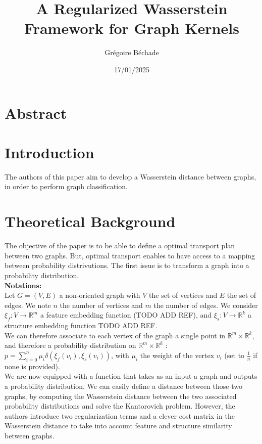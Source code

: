\documentclass[a4paper,11pt]{article}
\begin{document}
\title{A Regularized Wasserstein Framework for Graph Kernels}
\author{Grégoire Béchade}
\date{17/01/2025}
\maketitle

\section{Abstract}

\section{Introduction}

The authors of this paper aim to develop a Wasserstein distance between graphs, in order to perform graph classification. 





\section{Theoretical Background}

The objective of the paper is to be able to define a optimal transport plan between two graphs. 
But, optimal transport enables to have access to a mapping between probability distrivutions. 
The first issue is to transform a graph into a probability distribution.\\[0.5cm]
\textbf{Notations:} \\
Let $G=(V, E)$ a non-oriented graph with $V$ the set of vertices and $E$ the set of edges.
We note $n$ the number of vertices and $m$ the number of edges.
We consider $\xi_f : V \rightarrow \mathbb{R}^m$ a feature embedding function (TODO ADD REF), and $\xi_s : V \rightarrow \mathbb{R}^k$ a structure embedding function TODO ADD REF.\\
We can therefore associate to each vertex of the graph a single point in $\mathbb{R}^m \times \mathbb{R}^k$, and therefore a probability distribution on $\mathbb{R}^m \times \mathbb{R}^k$ : $p = \sum_{i=0}^{n} \mu_i \delta(\xi_f(v_i), \xi_s(v_i))$, with $\mu_i$ the weight of the vertex $v_i$ (set to $\frac{1}{n}$ if none is provided).\\


We are now equipped with a function that takes as an input a graph and outputs a probability distribution.
We can easily define a distance between those two graphs, by computing the Wasserstein distance between the two associated probability distributions and solve the Kantorovich problem. 
However, the authors introduce two regularization terms and a clever cost matrix in the Wasserstein distance to take into account feature and structure similarity between graphs. \\[0.5cm]
\end{document}
